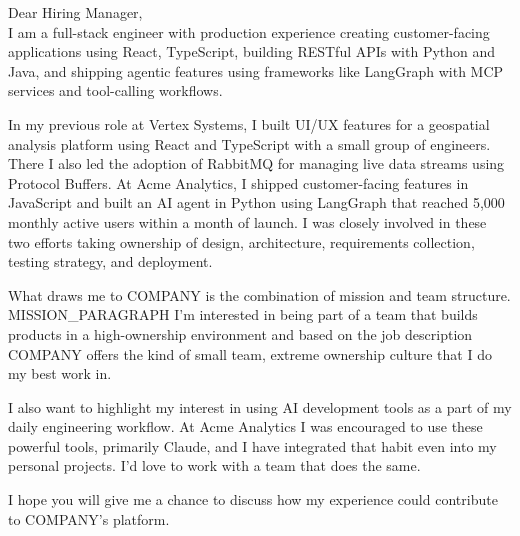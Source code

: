 \noindent
Dear Hiring Manager,
\\

I am a full-stack engineer with production experience creating customer-facing applications using React, TypeScript, building RESTful APIs with Python and Java, and shipping agentic features using frameworks like LangGraph with MCP services and tool-calling workflows.

In my previous role at Vertex Systems, I built UI/UX features for a geospatial analysis platform using React and TypeScript with a small group of engineers. There I also led the adoption of RabbitMQ for managing live data streams using Protocol Buffers. At Acme Analytics, I shipped customer-facing features in JavaScript and built an AI agent in Python using LangGraph that reached 5,000 monthly active users within a month of launch. I was closely involved in these two efforts taking ownership of design, architecture, requirements collection, testing strategy, and deployment.

What draws me to {{COMPANY}} is the combination of mission and team structure. {{MISSION_PARAGRAPH}} I'm interested in being part of a team that builds products in a high-ownership environment and based on the job description {{COMPANY}} offers the kind of small team, extreme ownership culture that I do my best work in.

I also want to highlight my interest in using AI development tools as a part of my daily engineering workflow. At Acme Analytics I was encouraged to use these powerful tools, primarily Claude, and I have integrated that habit even into my personal projects. I'd love to work with a team that does the same.

I hope you will give me a chance to discuss how my experience could contribute to {{COMPANY}}'s platform.

\vskip 2.0cm
